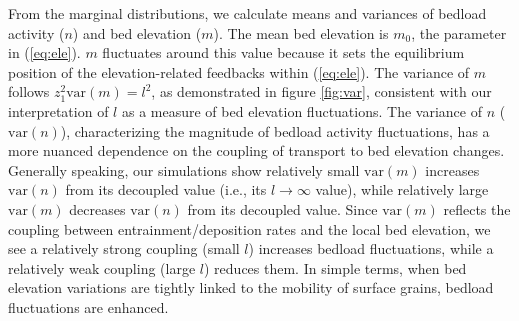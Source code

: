 \documentclass[draft]{agujournal2018}
\begin{document}
From the marginal distributions, we calculate means and variances of bedload activity ($n$) and bed elevation ($m$).
The mean bed elevation is $m_0$, the parameter in (\ref{eq:ele}). $m$ fluctuates around this value because it sets the equilibrium position of the elevation-related feedbacks within (\ref{eq:ele}).
The variance of $m$ follows $z_1^2 \text{var}(m) = l^2$, as demonstrated in figure \ref{fig:var}, consistent with our interpretation of $l$ as a measure of bed elevation fluctuations.
The variance of $n$ ($\text{var}(n)$), characterizing the magnitude of bedload activity fluctuations, has a more nuanced dependence on the coupling of transport to bed elevation changes.
Generally speaking, our simulations show relatively small $\text{var}(m)$ increases $\text{var}(n)$ from its decoupled value (i.e., its $l\rightarrow \infty$ value), while relatively large $\text{var}(m)$ decreases $\text{var}(n)$ from its decoupled value.
Since $\text{var}(m)$ reflects the coupling between entrainment/deposition rates and the local bed elevation, we see a relatively strong coupling (small $l$) increases bedload fluctuations, while a relatively weak coupling (large $l$) reduces them.
In simple terms, when bed elevation variations are tightly linked to the mobility of surface grains, bedload fluctuations are enhanced.

\end{document}
